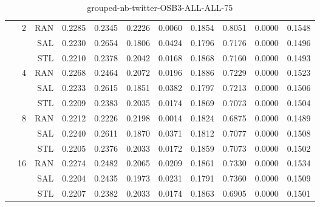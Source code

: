\begin{center}
\begin{table}[htbp]
\begin{tabular}{ | r | r | r | r | r | r | r | r | r | r | r |}
 & \multirow{3}{*}{2} & RAN & 0.2285 & 0.2345 & 0.2226 & 0.0060 & 0.1854 & 0.8051 & 0.0000 & 0.1548\\ \cline{3-11}
 &   & SAL & 0.2230 & 0.2654 & 0.1806 & 0.0424 & 0.1796 & 0.7176 & 0.0000 & 0.1496\\ \cline{3-11}
 &   & STL & 0.2210 & 0.2378 & 0.2042 & 0.0168 & 0.1868 & 0.7160 & 0.0000 & 0.1493\\ \cline{2-11}
 & \multirow{3}{*}{4} & RAN & 0.2268 & 0.2464 & 0.2072 & 0.0196 & 0.1886 & 0.7229 & 0.0000 & 0.1523\\ \cline{3-11}
 &   & SAL & 0.2233 & 0.2615 & 0.1851 & 0.0382 & 0.1797 & 0.7213 & 0.0000 & 0.1506\\ \cline{3-11}
 &   & STL & 0.2209 & 0.2383 & 0.2035 & 0.0174 & 0.1869 & 0.7073 & 0.0000 & 0.1504\\ \cline{2-11}
 & \multirow{3}{*}{8} & RAN & 0.2212 & 0.2226 & 0.2198 & 0.0014 & 0.1824 & 0.6875 & 0.0000 & 0.1489\\ \cline{3-11}
 &   & SAL & 0.2240 & 0.2611 & 0.1870 & 0.0371 & 0.1812 & 0.7077 & 0.0000 & 0.1508\\ \cline{3-11}
 &   & STL & 0.2205 & 0.2376 & 0.2033 & 0.0172 & 0.1859 & 0.7073 & 0.0000 & 0.1502\\ \cline{2-11}
 & \multirow{3}{*}{16} & RAN & 0.2274 & 0.2482 & 0.2065 & 0.0209 & 0.1861 & 0.7330 & 0.0000 & 0.1534\\ \cline{3-11}
 &   & SAL & 0.2204 & 0.2435 & 0.1973 & 0.0231 & 0.1791 & 0.7360 & 0.0000 & 0.1509\\ \cline{3-11}
 &   & STL & 0.2207 & 0.2382 & 0.2033 & 0.0174 & 0.1863 & 0.6905 & 0.0000 & 0.1501\\ \cline{2-11}
\hline
\end{tabular}
\caption{grouped-nb-twitter-OSB3-ALL-ALL-75}
\end{table}
\end{center}

